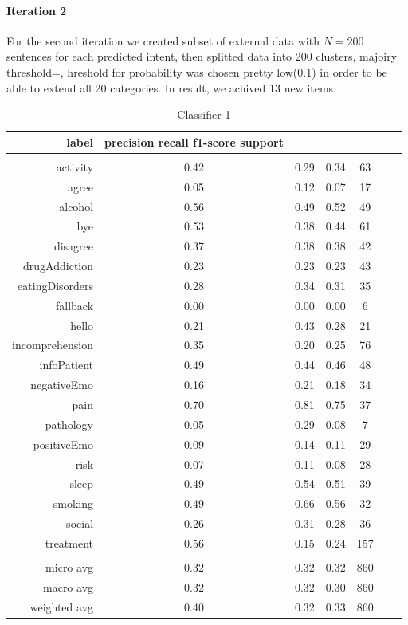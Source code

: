 \documentclass[11pt]{article}
\begin{document}
\paragraph{Iteration 2} For the second iteration we created subset of external data with $N=200$ sentences for each predicted intent, then splitted data into 200 clusters, majoiry threshold=, hreshold for probability was chosen pretty low(0.1) in order to be able to extend all 20 categories. In result, we achived 13 new items.

\begin{table}[htb]
\begin{center}
\begin{tabular}{ |r|c|c|c|c|c|c| }
label  &    precision    recall  f1-score   support\\ \hline 
\\ \hline 
activity &  0.42 & 0.29 & 0.34 &   63\\ \hline 
agree &  0.05 & 0.12 & 0.07 &   17\\ \hline 
alcohol &  0.56 & 0.49 & 0.52 &   49\\ \hline 
bye &  0.53 & 0.38 & 0.44 &   61\\ \hline 
disagree &  0.37 & 0.38 & 0.38 &   42\\ \hline 
drugAddiction &  0.23 & 0.23 & 0.23 &   43\\ \hline 
eatingDisorders &  0.28 & 0.34 & 0.31 &   35\\ \hline 
fallback &  0.00 & 0.00 & 0.00 &    6\\ \hline 
hello &  0.21 & 0.43 & 0.28 &   21\\ \hline 
incomprehension &  0.35 & 0.20 & 0.25 &   76\\ \hline 
infoPatient &  0.49 & 0.44 & 0.46 &   48\\ \hline 
negativeEmo &  0.16 & 0.21 & 0.18 &   34\\ \hline 
pain &  0.70 & 0.81 & 0.75 &   37\\ \hline 
pathology &  0.05 & 0.29 & 0.08 &    7\\ \hline 
positiveEmo &  0.09 & 0.14 & 0.11 &   29\\ \hline 
risk &  0.07 & 0.11 & 0.08 &   28\\ \hline 
sleep &  0.49 & 0.54 & 0.51 &   39\\ \hline 
smoking &  0.49 & 0.66 & 0.56 &   32\\ \hline 
social &  0.26 & 0.31 & 0.28 &   36\\ \hline 
treatment &  0.56 & 0.15 & 0.24 &  157\\ \hline 
\\ \hline 
micro avg &  0.32 & 0.32 & 0.32 &  860\\ \hline 
macro avg &  0.32 & 0.32 & 0.30 &  860\\ \hline 
weighted avg &  0.40 & 0.32 & 0.33 &  860\\ \hline 
\end{tabular}
\caption{Classifier 1}
\end{center}
\end{table}
\FloatBarrier
\end{document}
